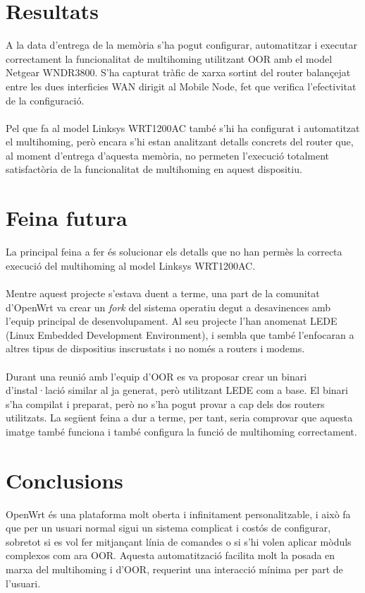 \documentclass[11pt]{article}
\begin{document}
\section{Resultats}
A la data d’entrega de la memòria s’ha pogut configurar, automatitzar i executar correctament la funcionalitat de multihoming utilitzant OOR amb el model Netgear WNDR3800. S’ha capturat tràfic de xarxa sortint del router balançejat entre les dues interficies WAN dirigit al Mobile Node, fet que verifica l’efectivitat de la configuració.\\
\\
Pel que fa al model Linksys WRT1200AC també s’hi ha configurat i automatitzat el multihoming, però encara s’hi estan analitzant detalls concrets del router que, al moment d’entrega d’aquesta memòria, no permeten l’execució totalment satisfactòria de la funcionalitat de multihoming en aquest dispositiu.

\section{Feina futura}
La principal feina a fer és solucionar els detalls que no han permès la correcta execució del multihoming al model Linksys WRT1200AC.\\
\\
Mentre aquest projecte s'estava duent a terme, una part de la comunitat d'OpenWrt va crear un \textit{fork} del sistema operatiu degut a desavinences amb l'equip principal de desenvolupament. Al seu projecte l'han anomenat LEDE (Linux Embedded Development Environment), i sembla que també l'enfocaran a altres tipus de dispositius inscrustats i no només a routers i modems.\\
\\
Durant una reunió amb l'equip d'OOR es va proposar crear un binari d'instal·lació similar al ja generat, però utilitzant LEDE com a base. El binari s'ha compilat i preparat, però no s'ha pogut provar a cap dels dos routers utilitzats. La següent feina a dur a terme, per tant, seria comprovar que aquesta imatge també funciona i també configura la funció de multihoming correctament.

\section{Conclusions}
OpenWrt és una plataforma molt oberta i infinitament personalitzable, i això fa que per un usuari normal sigui un sistema complicat i costós de configurar, sobretot si es vol fer mitjançant línia de comandes o si s’hi volen aplicar mòduls complexos com ara OOR. Aquesta automatització facilita molt la posada en marxa del multihoming i d’OOR, requerint una interacció mínima per part de l’usuari.
\end{document}

